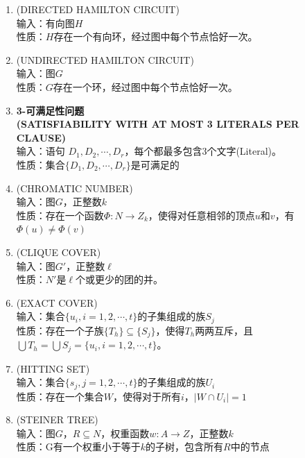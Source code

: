 \documentclass[twocolumn]{article}
\theoremstyle{nonumberplain}%
\begin{document}
\begin{CJK}{UTF8}{gbsn}
\begin{enumerate}
    \item {(DIRECTED HAMILTON CIRCUIT)}\\
    输入：有向图$H$\\
    性质：$H$存在一个有向环，经过图中每个节点恰好一次。

    \item {(UNDIRECTED HAMILTON CIRCUIT)}\\
    输入：图$G$\\
    性质：$G$存在一个环，经过图中每个节点恰好一次。

    \item {\bf3-可满足性问题\\(SATISFIABILITY WITH AT MOST 3 LITERALS PER CLAUSE)}\\
    输入：语句 $D_1,D_2,\cdots,D_r$，每个都最多包含3个文字(Literal)。\\
    性质：集合$\{D_1,D_2,\cdots,D_r\}$是可满足的

    \item {(CHROMATIC NUMBER)}\\
    输入：图$G$，正整数$k$\\
    性质：存在一个函数$\Phi:N\rightarrow Z_k$，使得对任意相邻的顶点$u$和$v$，有$\Phi(u)\neq\Phi(v)$

    \item {(CLIQUE COVER)}\\
    输入：图$G'$，正整数$\ell$\\
    性质：$N'$是$\ell$个或更少的团的并。

    \item {(EXACT COVER)}\\
    输入：集合$\{u_i,i=1,2,\cdots,t\}$的子集组成的族${S_j}$\\
    性质：存在一个子族$\{T_h\}\subseteq\{S_j\}$，使得$T_h$两两互斥，且$\bigcup T_h=\bigcup S_j=\{u_i,i=1,2,\cdots,t\}$。

    \item {(HITTING SET)}\\
    输入：集合$\{s_j,j=1,2,\cdots,t\}$的子集组成的族${U_i}$\\
    性质：存在一个集合$W$，使得对于所有$i$，$|W\cap U_i|=1$

    \item {(STEINER TREE)}\\
    输入：图$G$，$R\subseteq N$，权重函数$w:A\rightarrow Z$，正整数$k$\\
    性质：G有一个权重小于等于$k$的子树，包含所有$R$中的节点


\end{enumerate}
\end{CJK}
\end{document}

